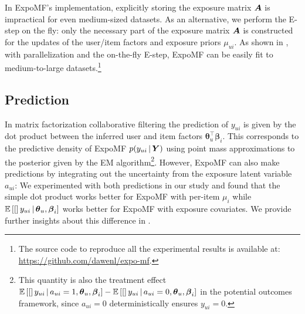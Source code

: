 In ExpoMF's implementation, explicitly storing the exposure matrix $\boldsymbol{A}$ is impractical for even medium-sized datasets. As an alternative, we perform the E-step on the fly: only the necessary part of the exposure matrix $\boldsymbol{A}$ is constructed for the updates of the user/item factors and exposure priors $\mu_{ui}$. As shown in , with parallelization and the on-the-fly E-step, ExpoMF can be easily fit to medium-to-large datasets.\footnote{The source code to reproduce all the experimental results is available at: \url{https://github.com/dawenl/expo-mf}.}

\subsection{Prediction} \label{sec:pred}
In matrix factorization collaborative filtering the prediction of $y_{ui}$ is given by the dot product between the inferred user and item factors $\boldsymbol\theta_u^\top\boldsymbol\beta_i$. This corresponds to the predictive density of ExpoMF $p(y_{ui} \,\vert\, \boldsymbol{Y})$ using point mass approximations  to the posterior given by the EM algorithm\footnote{This quantity is also the treatment effect $\mathbb{E}\left[[\right]y_{ui} \,\vert\, a_{ui}=1, \boldsymbol\theta_u, \boldsymbol\beta_i] - \mathbb{E}\left[[\right]y_{ui} \,\vert\, a_{ui}=0, \boldsymbol\theta_u, \boldsymbol\beta_i]$ in the potential outcomes framework, since $a_{ui}=0$ deterministically ensures $y_{ui}=0$.}. 
However, ExpoMF can also make predictions by integrating out the uncertainty from the exposure latent variable $a_{ui}$:
We experimented with both predictions in our study and found that the
simple dot product works better for ExpoMF with per-item $\mu_i$ while
$\mathbb{E}\left[[\right]y_{ui} \,\vert\, \boldsymbol\theta_u, \boldsymbol\beta_i]$ works better for ExpoMF with exposure covariates. We provide further insights about this difference in .




